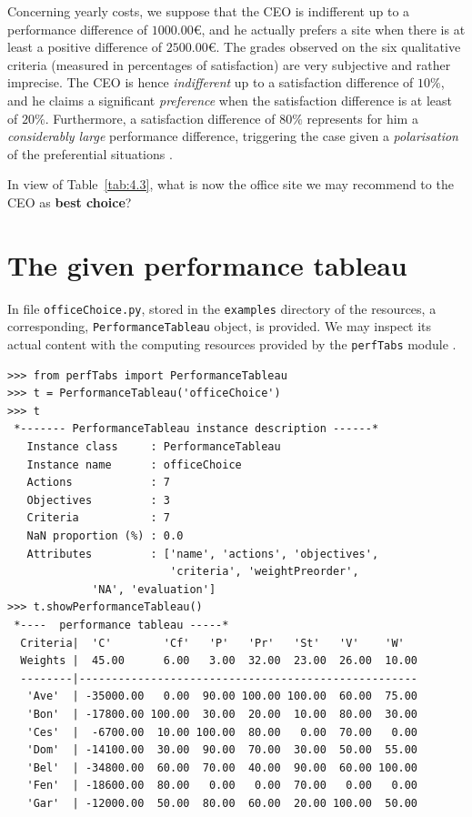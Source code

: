 Concerning yearly costs, we suppose that the CEO is indifferent up to a performance difference of $1000.00$€, and he actually prefers a site when there is at least a positive difference of $2500.00$€. The grades observed on the six qualitative criteria (measured in percentages of satisfaction) are very subjective and rather imprecise. The CEO is hence \emph{indifferent} up to a satisfaction difference of $10\%$, and he claims a significant \emph{preference} when the satisfaction difference is at least of $20\%$.  Furthermore, a satisfaction difference of $80\%$ represents for him a \emph{considerably large} performance difference, triggering the case given a \emph{polarisation} of the preferential situations \citep{BIS-2013}. 

In view of Table~\vref{tab:4.3}, what is now the office site we may recommend to the CEO as \textbf{best choice}?

\section{The given performance tableau}
\label{sec:4.2}


In file \texttt{officeChoice.py}, stored in the \texttt{examples} directory of the \Digraph resources, a corresponding, \texttt{PerformanceTableau} object, is provided. We may inspect its actual content with the computing resources provided by the \texttt{perfTabs} module .
\begin{lstlisting}[caption={Inspecting the \texttt{officeChoice} performance tableau.},label=list:4.1]
>>> from perfTabs import PerformanceTableau
>>> t = PerformanceTableau('officeChoice')
>>> t
 *------- PerformanceTableau instance description ------*
   Instance class     : PerformanceTableau
   Instance name      : officeChoice
   Actions            : 7
   Objectives         : 3
   Criteria           : 7
   NaN proportion (%) : 0.0
   Attributes         : ['name', 'actions', 'objectives',
                         'criteria', 'weightPreorder',
			 'NA', 'evaluation']
>>> t.showPerformanceTableau()
 *----  performance tableau -----*
  Criteria|  'C'        'Cf'   'P'   'Pr'   'St'   'V'    'W'   
  Weights |  45.00      6.00   3.00  32.00  23.00  26.00  10.00    
  --------|----------------------------------------------------
   'Ave'  | -35000.00   0.00  90.00 100.00 100.00  60.00  75.00  
   'Bon'  | -17800.00 100.00  30.00  20.00  10.00  80.00  30.00  
   'Ces'  |  -6700.00  10.00 100.00  80.00   0.00  70.00   0.00  
   'Dom'  | -14100.00  30.00  90.00  70.00  30.00  50.00  55.00  
   'Bel'  | -34800.00  60.00  70.00  40.00  90.00  60.00 100.00  
   'Fen'  | -18600.00  80.00   0.00   0.00  70.00   0.00   0.00  
   'Gar'  | -12000.00  50.00  80.00  60.00  20.00 100.00  50.00  
\end{lstlisting}

